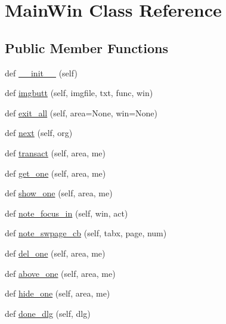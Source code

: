 \hypertarget{classdibagui_1_1_main_win}{}\section{Main\+Win Class Reference}
\label{classdibagui_1_1_main_win}
\subsection*{Public Member Functions}
\begin{DoxyCompactItemize}
\item 
def \hyperlink{classdibagui_1_1_main_win_ae64f0875afe3067b97ba370b354b9213}{\+\_\+\+\_\+init\+\_\+\+\_\+} (self)
\item 
def \hyperlink{classdibagui_1_1_main_win_a466c72a278968f797537b7bb3580f1b3}{imgbutt} (self, imgfile, txt, func, win)
\item 
def \hyperlink{classdibagui_1_1_main_win_a755988eaefd1fe0b4803b3eb4e22cf62}{exit\+\_\+all} (self, area=None, win=None)
\item 
def \hyperlink{classdibagui_1_1_main_win_ad1a61436bdc272bc9204e50462cfaadd}{next} (self, org)
\item 
def \hyperlink{classdibagui_1_1_main_win_a6a5b6d30b6cb3961e1f825b553f36b59}{transact} (self, area, me)
\item 
def \hyperlink{classdibagui_1_1_main_win_aa1be1965c9e4fba83ffe91fe97c3257b}{get\+\_\+one} (self, area, me)
\item 
def \hyperlink{classdibagui_1_1_main_win_a731892ba673be11c220b8d3306001be6}{show\+\_\+one} (self, area, me)
\item 
def \hyperlink{classdibagui_1_1_main_win_a385fd12b4740b087eb0e24ab6fa72396}{note\+\_\+focus\+\_\+in} (self, win, act)
\item 
def \hyperlink{classdibagui_1_1_main_win_a675dfb2de31ed3836c00bdc2545be10f}{note\+\_\+swpage\+\_\+cb} (self, tabx, page, num)
\item 
def \hyperlink{classdibagui_1_1_main_win_a5927791c4905069d5e2422577e5b9fa8}{del\+\_\+one} (self, area, me)
\item 
def \hyperlink{classdibagui_1_1_main_win_a4802385c549037f5813de35842fcbd55}{above\+\_\+one} (self, area, me)
\item 
def \hyperlink{classdibagui_1_1_main_win_ab2299ab818c9eb02e8307ca0fc41485b}{hide\+\_\+one} (self, area, me)
\item 
def \hyperlink{classdibagui_1_1_main_win_aa9e9c953cb53a8ab3cde7ec87464c67e}{done\+\_\+dlg} (self, dlg)

\end{DoxyCompactItemize}
